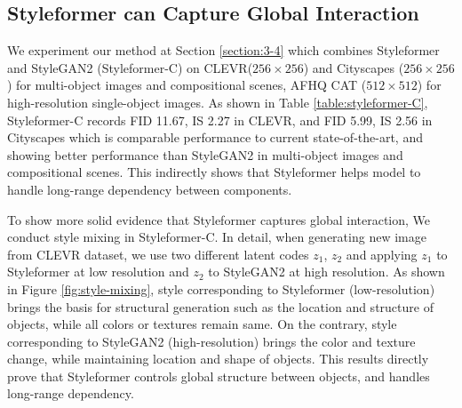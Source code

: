 \documentclass[10pt,twocolumn,letterpaper]{article}
\begin{document}
\subsection{Styleformer can Capture Global Interaction}
\label{section:4-3}
We experiment our method at Section \ref{section:3-4} which combines Styleformer and StyleGAN2 (Styleformer-C) on CLEVR($256 \times 256$) \cite{johnson2016clevr} and Cityscapes ($256 \times 256$) \cite{cordts2016cityscapes} for multi-object images and compositional scenes, AFHQ CAT ($512 \times 512$) \cite{choi2020stargan} for high-resolution single-object images. As shown in Table \ref{table:styleformer-C}, Styleformer-C records FID 11.67, IS 2.27 in CLEVR, and FID 5.99, IS 2.56 in Cityscapes which is comparable performance to current state-of-the-art, and showing better performance than StyleGAN2 in multi-object images and compositional scenes. This indirectly shows that Styleformer helps model to handle long-range dependency between components. 
 
To show more solid evidence that Styleformer captures global interaction, We conduct style mixing \cite{karras2019stylebased} in Styleformer-C. In detail, when generating new image from CLEVR dataset, we use two different latent codes $z_1$, $z_2$ and applying $z_1$ to Styleformer at low resolution and $z_2$ to StyleGAN2 at high resolution. As shown in Figure \ref{fig:style-mixing}, style corresponding to Styleformer (low-resolution) brings the basis for structural generation such as the location and structure of objects, while all colors or textures remain same. On the contrary, style corresponding to StyleGAN2 (high-resolution) brings the color and texture change, while maintaining location and shape of objects. This results directly prove that Styleformer controls global structure between objects, and handles long-range dependency. 
\end{document}
